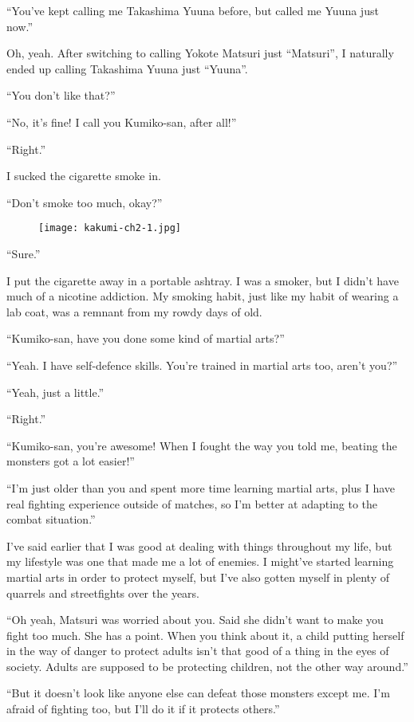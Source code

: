 ``You've kept calling me Takashima Yuuna before, but called me Yuuna just now.''

Oh, yeah. After switching to calling Yokote Matsuri just ``Matsuri'', I naturally ended up calling Takashima Yuuna just ``Yuuna''.

``You don't like that?''

``No, it's fine! I call you Kumiko-san, after all!''

``Right.''

I sucked the cigarette smoke in.

``Don't smoke too much, okay?''

\begin{figure}[p]
\texttt{[image: kakumi-ch2-1.jpg]}
\end{figure}


``Sure.''

I put the cigarette away in a portable ashtray. I was a smoker, but I didn't have much of a nicotine addiction. My smoking habit, just like my habit of wearing a lab coat, was a remnant from my rowdy days of old.

``Kumiko-san, have you done some kind of martial arts?''

``Yeah. I have self-defence skills. You're trained in martial arts too, aren't you?''

``Yeah, just a little.''

``Right.''

``Kumiko-san,  you're awesome! When I fought the way you told me, beating the monsters got a lot easier!''

``I'm just older than you and spent more time learning martial arts, plus I have real fighting experience outside of matches, so I'm better at adapting to the combat situation.''

I've said earlier that I was good at dealing with things throughout my life, but my lifestyle was one that made me a lot of enemies. I might've started learning martial arts in order to protect myself, but I've also gotten myself in plenty of quarrels and streetfights over the years.

``Oh yeah, Matsuri was worried about you. Said she didn't want to make you fight too much. She has a point. When you think about it, a child putting herself in the way of danger to protect adults isn't that good of a thing in the eyes of society. Adults are supposed to be protecting children, not the other way around.''

``But it doesn't look like anyone else can defeat those monsters except me. I'm afraid of fighting too, but I'll do it if it protects others.''

